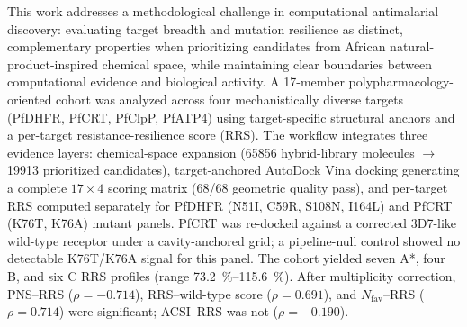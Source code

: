 \documentclass[9pt,letterpaper]{article}
\begin{document}
This work addresses a methodological challenge in computational antimalarial discovery: evaluating target breadth and mutation resilience as distinct, complementary properties when prioritizing candidates from African natural-product-inspired chemical space, while maintaining clear boundaries between computational evidence and biological activity. A 17-member polypharmacology-oriented cohort was analyzed across four mechanistically diverse targets (PfDHFR, PfCRT, PfClpP, PfATP4) using target-specific structural anchors and a per-target resistance-resilience score (RRS). The workflow integrates three evidence layers: chemical-space expansion (\num{65856} hybrid-library molecules $\rightarrow$ \num{19913} prioritized candidates), target-anchored AutoDock Vina docking generating a complete $\num{17}\times\num{4}$ scoring matrix (\num{68}/\num{68} geometric quality pass), and per-target RRS computed separately for PfDHFR (N51I, C59R, S108N, I164L) and PfCRT (K76T, K76A) mutant panels. PfCRT was re-docked against a corrected 3D7-like wild-type receptor under a cavity-anchored grid; a pipeline-null control showed no detectable K76T/K76A signal for this panel. The cohort yielded seven A*, four B, and six C RRS profiles (range \qtyrange{73.2}{115.6}{\percent}). After multiplicity correction, PNS--RRS ($\rho=-\num{0.714}$), RRS--wild-type score ($\rho=\num{+0.691}$), and $N_{\mathrm{fav}}$--RRS ($\rho=\num{0.714}$) were significant; ACSI--RRS was not ($\rho=-\num{0.190}$).
\end{document}
